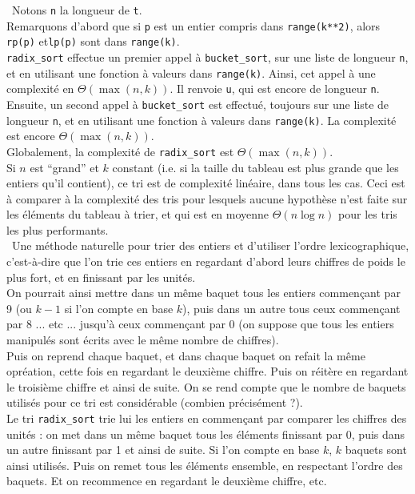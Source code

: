 \question\ Notons \texttt{n} la longueur de \texttt{t}.\\
Remarquons d'abord que si \texttt{p} est un entier compris dans 
\texttt{range(k**2)}, alors \texttt{rp(p)} 
et\texttt{lp(p)} sont dans \texttt{range(k)}.\\
\verb|radix_sort| effectue un premier appel à \verb|bucket_sort|, sur une liste de longueur \texttt{n}, et en utilisant 
une fonction à valeurs dans \texttt{range(k)}. Ainsi, cet appel à une complexité en $\Theta(\max(n,k))$. Il renvoie 
\texttt{u}, qui est encore de longueur \texttt{n}.\\
Ensuite, un second appel à \verb|bucket_sort| est effectué, toujours sur une liste de longueur \texttt{n}, et en 
utilisant une fonction à valeurs dans \texttt{range(k)}. La complexité est encore $\Theta(\max(n,k))$.\\
Globalement, la complexité de \verb|radix_sort| est $\Theta(\max(n,k))$.\\
Si $n$ est ``grand'' et $k$ constant (i.e. si la taille du tableau est plus 
grande que les entiers qu'il contient), ce tri est de complexité linéaire, dans 
tous les cas. Ceci est à comparer à la complexité des tris pour lesquels aucune 
hypothèse n'est faite sur les éléments du tableau à trier, et qui est en 
moyenne $\Theta(n\log n)$ pour les tris les plus performants.\\

\question\ Une méthode naturelle pour trier des entiers et d'utiliser l'ordre 
lexicographique, c'est-à-dire que l'on trie ces entiers en regardant d'abord 
leurs chiffres de poids le plus fort, et en finissant par les unités.\\
On pourrait ainsi mettre dans un même baquet tous les entiers commençant par 9 
(ou $k-1$ si l'on compte en base $k$), puis dans un autre tous ceux commençant 
par 8 ... etc ... jusqu'à ceux commençant par 0 (on suppose que tous les 
entiers manipulés sont écrits avec le même nombre de chiffres).\\
Puis on reprend chaque baquet, et dans chaque baquet on refait la même 
opréation, cette fois en regardant le deuxième chiffre. Puis on réitère en 
regardant le troisième chiffre et ainsi de suite. On se rend compte que le 
nombre de baquets utilisés pour ce tri est considérable (combien précisément 
?).\\
Le tri \verb|radix_sort| trie lui les entiers en commençant par comparer les 
chiffres des unités : on met dans un même baquet tous les éléments finissant 
par 0, puis dans un autre finissant par 1 et ainsi de suite. Si l'on compte en 
base $k$, $k$ baquets sont ainsi utilisés. Puis on remet tous les éléments 
ensemble, en respectant l'ordre des baquets. Et on recommence en regardant le 
deuxième chiffre, etc.\\

